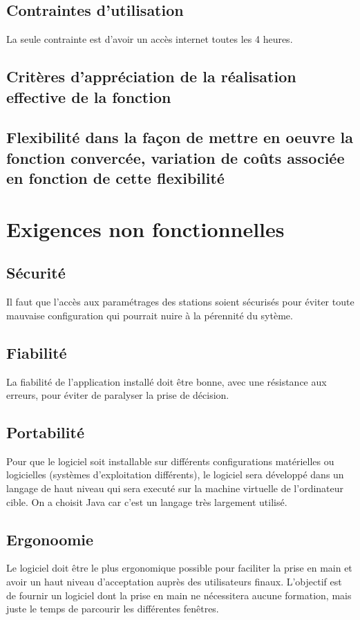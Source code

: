 \subsection{Contraintes d'utilisation}
La seule contrainte est d'avoir un accès internet toutes les 4 heures.

\subsection{Critères d'appréciation de la réalisation effective de la fonction}

\subsection{Flexibilité dans la façon de mettre en oeuvre la fonction convercée, variation de coûts associée en fonction de cette flexibilité}

\section{Exigences non fonctionnelles}
\subsection{Sécurité}
Il faut que l'accès aux paramétrages des stations soient sécurisés pour éviter toute mauvaise configuration qui pourrait nuire à la pérennité du sytème.

\subsection{Fiabilité}
La fiabilité de l'application installé doit être bonne, avec une résistance aux erreurs, pour éviter de paralyser la prise de décision.

\subsection{Portabilité}
Pour que le logiciel soit installable sur différents configurations matérielles ou logicielles (systèmes d'exploitation différents), le logiciel sera développé dans un langage de haut niveau qui sera executé sur la machine virtuelle de l'ordinateur cible. On a choisit Java car c'est un langage très largement utilisé.

\subsection{Ergonoomie}
Le logiciel doit être le plus ergonomique possible pour faciliter la prise en main et avoir un haut niveau d'acceptation auprès des utilisateurs finaux. L'objectif est de fournir un logiciel dont la prise en main ne nécessitera aucune formation, mais juste le temps de parcourir les différentes fenêtres.

